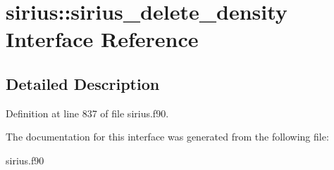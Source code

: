 \hypertarget{interfacesirius_1_1sirius__delete__density}{}\section{sirius\+:\+:sirius\+\_\+delete\+\_\+density Interface Reference}
\label{interfacesirius_1_1sirius__delete__density}


\subsection{Detailed Description}


Definition at line 837 of file sirius.\+f90.



The documentation for this interface was generated from the following file\+:\begin{DoxyCompactItemize}
\item 
sirius.\+f90\end{DoxyCompactItemize}

